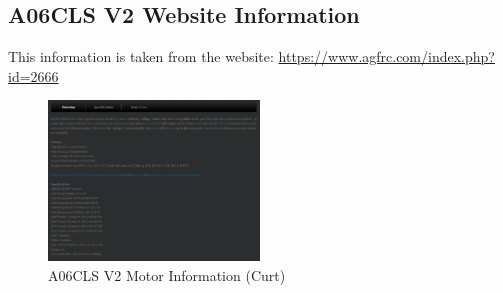 \subsection{A06CLS V2 Website Information}
This information is taken from the website: \url{https://www.agfrc.com/index.php?id=2666}
\label{appendix:A06CLS_V2_website_information}
\begin{figure}[H]
    \centering
    \includegraphics[width=0.5\textwidth]{Images/A06_motor_info_curt.png}
    \caption{A06CLS V2 Motor Information (Curt)}
    \label{fig:A06CLS_V2_motor_info_curt}
\end{figure}

